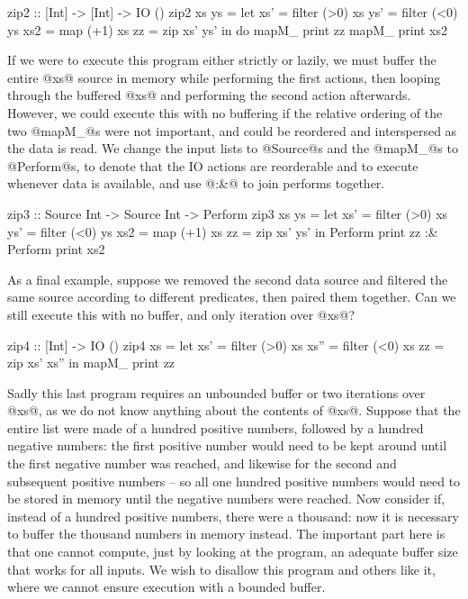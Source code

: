 \begin{code}
zip2 :: [Int] -> [Int] -> IO ()
zip2 xs ys
 = let xs'  = filter (>0) xs
       ys'  = filter (<0) ys
       xs2  = map    (+1) xs
       zz   = zip xs' ys'
   in  do   mapM_ print   zz
            mapM_ print   xs2
\end{code}

If we were to execute this program either strictly or lazily, we must buffer the entire @xs@ source in memory while performing the first actions, then looping through the buffered @xs@ and performing the second action afterwards.
However, we could execute this with no buffering if the relative ordering of the two @mapM_@s were not important, and could be reordered and interspersed as the data is read.
We change the input lists to @Source@s and the @mapM_@s to @Perform@s, to denote that the IO actions are reorderable and to execute whenever data is available, and use @:&@ to join performs together.

\begin{code}
zip3 :: Source Int -> Source Int -> Perform
zip3 xs ys
 = let xs'  = filter (>0) xs
       ys'  = filter (<0) ys
       xs2  = map    (+1) xs
       zz   = zip xs' ys'
   in  Perform print      zz
   :&  Perform print      xs2
\end{code}

As a final example, suppose we removed the second data source and filtered the same source according to different predicates, then paired them together.
Can we still execute this with no buffer, and only iteration over @xs@?

\begin{code}
zip4 :: [Int] -> IO ()
zip4 xs
 = let xs'  = filter (>0) xs
       xs'' = filter (<0) xs
       zz   = zip xs' xs''
   in  mapM_ print        zz
\end{code}

Sadly this last program requires an unbounded buffer or two iterations over @xs@, as we do not know anything about the contents of @xs@.
Suppose that the entire list were made of a hundred positive numbers, followed by a hundred negative numbers: the first positive number would need to be kept around until the first negative number was reached, and likewise for the second and subsequent positive numbers -- so all one hundred positive numbers would need to be stored in memory until the negative numbers were reached.
Now consider if, instead of a hundred positive numbers, there were a thousand: now it is necessary to buffer the thousand numbers in memory instead.
The important part here is that one cannot compute, just by looking at the program, an adequate buffer size that works for all inputs.
We wish to disallow this program and others like it, where we cannot ensure execution with a bounded buffer.



